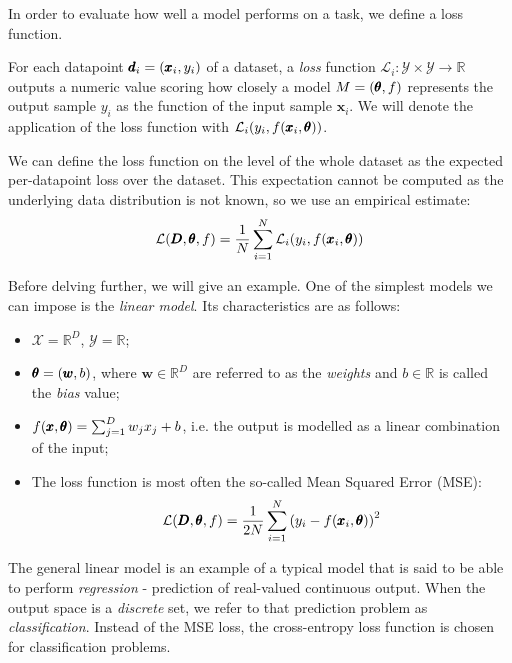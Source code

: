 In order to evaluate how well a model performs on a task, we define a loss function.

\begin{definition}
For each datapoint $\pmb{d}_i=\mathopen{}\left(\pmb{x}_i, y_i\right)$ of a dataset, a \emph{loss} function $\mathcal{L}_{i}: \mathcal{Y} \times \mathcal{Y} \to \mathbb{R} $ outputs a numeric value scoring how closely a model $M = \mathopen{}\left(\pmb{\theta}, f\right)$ represents the output sample $y_i$ as the function of the input sample $\pmb{x}_i$. We will denote the application of the loss function with $\mathcal{L}_{i}\mathopen{}\left(y_i, f\mathopen{}\left(\pmb{x}_i, \pmb{\theta}\right)\right)$.

We can define the loss function on the level of the whole dataset as the expected per-datapoint loss over the dataset. This expectation cannot be computed as the underlying data distribution is not known, so we use an empirical estimate: \begin{equation}
\mathcal{L}\mathopen{}\left(\pmb{D}, \pmb{\theta}, f\right) = \frac{1}{N}\sum_{i=1}^{N}{\mathcal{L}_{i}\mathopen{}\left(y_i, f\mathopen{}\left(\pmb{x}_i, \pmb{\theta}\right)\right)}
\end{equation}
\end{definition}

Before delving further, we will give an example. One of the simplest models we can impose is the \emph{linear model}. Its characteristics are as follows:
\begin{itemize}
\item $\mathcal{X} = \mathbb{R}^D$, $\mathcal{Y}=\mathbb{R}$;
\item $\pmb{\theta} = \mathopen{}\left(\pmb{w}, b\right)$, where $\pmb{w} \in \mathbb{R}^D$ are referred to as the \emph{weights} and $b \in \mathbb{R}$ is called the \emph{bias} value;
\item $f\mathopen{}\left(\pmb{x}, \pmb{\theta}\right) = \sum_{j=1}^{D}{w_j x_j} + b$, i.e. the output is modelled as a linear combination of the input;
\item The loss function is most often the so-called Mean Squared Error (MSE): \begin{equation}
\mathcal{L}\mathopen{}\left(\pmb{D}, \pmb{\theta}, f\right) = \frac{1}{2N}\sum_{i=1}^{N}{\mathopen{}\left(y_i - f\mathopen{}\left(\pmb{x}_i, \pmb{\theta}\right)\right)^2}
\end{equation}
\end{itemize}

The general linear model is an example of a typical model that is said to be able to perform \emph{regression} - prediction of real-valued continuous output. When the output space is a \emph{discrete} set, we refer to that prediction problem as \emph{classification}. Instead of the MSE loss, the cross-entropy loss function is chosen for classification problems.

